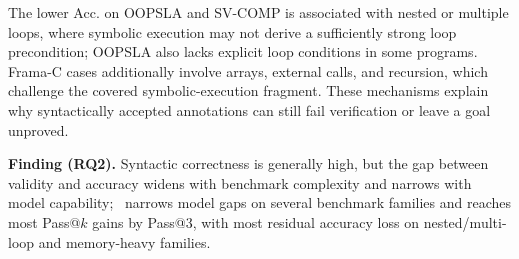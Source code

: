 The lower Acc. on OOPSLA and SV-COMP is associated with nested or multiple
loops, where symbolic execution may not derive a sufficiently strong loop
precondition; OOPSLA also lacks explicit loop conditions in some programs.
Frama-C cases additionally involve arrays, external calls, and recursion,
which challenge the covered symbolic-execution fragment. These mechanisms
explain why syntactically accepted annotations can still fail verification
or leave a goal unproved.

\begin{finding}
\textbf{Finding (RQ2).} Syntactic correctness is generally high, but the gap between validity and accuracy widens with benchmark complexity and narrows with model capability; \toolname\ narrows model gaps on several benchmark families and reaches most Pass@$k$ gains by Pass@3, with most residual accuracy loss on nested/multi-loop and memory-heavy families.
\end{finding}
